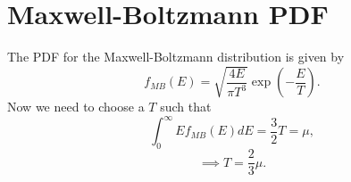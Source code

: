 \documentclass{article}
\begin{document}
\section{Maxwell-Boltzmann PDF}

The PDF for the Maxwell-Boltzmann distribution is given by
\[
f_{MB}(E) = \sqrt{\frac{4E}{\pi T^3}}\exp\left(-\frac{E}{T}\right).
\]
Now we need to choose a $T$ such that
\[
\int_{0}^\infty E f_{MB}(E)dE = \frac{3}{2}T = \mu,
\]
\[\implies T = \frac{2}{3} \mu.\]




\end{document}

